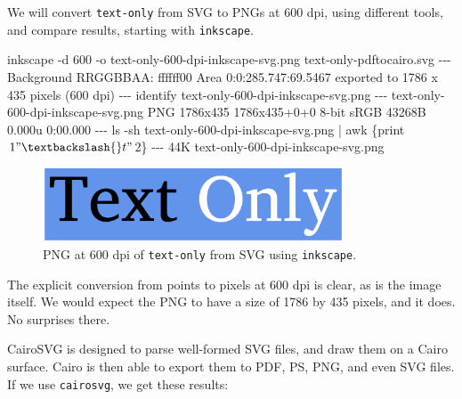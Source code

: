\documentclass[
  11pt,
  british,
  a4paper,
]{article}
\newenvironment{Shaded}{\begin{snugshade}}{\end{snugshade}}
\newcommand{\AttributeTok}[1]{\textcolor[rgb]{0.80,0.80,0.80}{#1}}
\newcommand{\ErrorTok}[1]{\textcolor[rgb]{0.76,0.75,0.62}{#1}}
\newcommand{\ExtensionTok}[1]{\textcolor[rgb]{0.80,0.80,0.80}{#1}}
\newcommand{\FunctionTok}[1]{\textcolor[rgb]{0.94,0.94,0.56}{#1}}
\newcommand{\KeywordTok}[1]{\textcolor[rgb]{0.94,0.87,0.69}{#1}}
\newcommand{\NormalTok}[1]{\textcolor[rgb]{0.80,0.80,0.80}{#1}}
\newcommand{\StringTok}[1]{\textcolor[rgb]{0.80,0.58,0.58}{#1}}
\begin{document}
We will convert \texttt{text-only} from SVG to PNGs at 600 dpi, using
different tools, and compare results, starting with \texttt{inkscape}.

\begin{Shaded}
\begin{Highlighting}[]
\ExtensionTok{inkscape}  \AttributeTok{{-}d}\NormalTok{ 600 }\AttributeTok{{-}o}\NormalTok{ text{-}only{-}600{-}dpi{-}inkscape{-}svg.png text{-}only{-}pdftocairo.svg}
\ExtensionTok{{-}{-}{-}}
\ExtensionTok{Background}\NormalTok{ RRGGBBAA: ffffff00}
\ExtensionTok{Area}\NormalTok{ 0:0:285.747:69.5467 exported to 1786 x 435 pixels }\ErrorTok{(}\ExtensionTok{600}\NormalTok{ dpi}\KeywordTok{)}
\ExtensionTok{{-}{-}{-}}
\ExtensionTok{identify}\NormalTok{ text{-}only{-}600{-}dpi{-}inkscape{-}svg.png}
\ExtensionTok{{-}{-}{-}}
\ExtensionTok{text{-}only{-}600{-}dpi{-}inkscape{-}svg.png}\NormalTok{ PNG 1786x435 1786x435+0+0 8{-}bit sRGB 43268B 0.000u 0:00.000}
\ExtensionTok{{-}{-}{-}}
\FunctionTok{ls} \AttributeTok{{-}sh}\NormalTok{ text{-}only{-}600{-}dpi{-}inkscape{-}svg.png }\KeywordTok{|} \FunctionTok{awk} \StringTok{\textquotesingle{}\{print $1 "\textbackslash{}t" $2\}\textquotesingle{}}
\ExtensionTok{{-}{-}{-}}
\ExtensionTok{44K}\NormalTok{     text{-}only{-}600{-}dpi{-}inkscape{-}svg.png}
\end{Highlighting}
\end{Shaded}

\begin{figure}
\hypertarget{fig:inkscapeSVGtoPNG}{%
\centering
\includegraphics[width=0.8\textwidth,height=\textheight]{images/text-only-600-dpi-inkscape-svg.png}
\caption{PNG at 600 dpi of \texttt{text-only} from SVG using
\texttt{inkscape}.}\label{fig:inkscapeSVGtoPNG}
}
\end{figure}

The explicit conversion from points to pixels at 600 dpi is clear, as is
the image itself. We would expect the PNG to have a size of 1786 by 435
pixels, and it does. No surprises there. \normalfont

CairoSVG is designed to parse well-formed SVG files, and draw them on a
Cairo surface. Cairo is then able to export them to PDF, PS, PNG, and
even SVG files. If we use \texttt{cairosvg}, we get these results:
\end{document}
